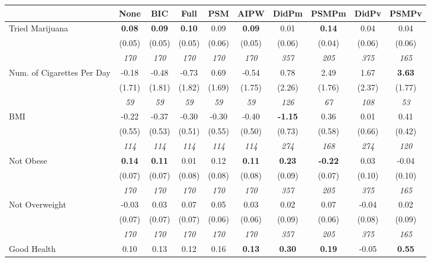 \begin{tabular}{l c c c c c c c c c}
\toprule
 & None & BIC & Full & PSM & AIPW & DidPm & PSMPm & DidPv & PSMPv \\
\midrule
Tried Marijuana & \textbf{ 0.08 } & \textbf{ 0.09 } & \textbf{ 0.10 } & 0.09 & \textbf{0.09} & 0.01 & \textbf{0.14} & 0.04 & 0.04 \\
& (0.05) & (0.05) & (0.05) & (0.06) & (0.05) & (0.06) & (0.04) & (0.06) & (0.06) \\
& \textit{ 170 } & \textit{ 170 } & \textit{ 170 } & \textit{ 170 } & \textit{ 170 } & \textit{ 357 } & \textit{ 205 } & \textit{ 375 } & \textit{ 165 } \\
Num. of Cigarettes Per Day & -0.18 & -0.48 & -0.73 & 0.69 & -0.54 & 0.78 & 2.49 & 1.67 & \textbf{3.63} \\
& (1.71) & (1.81) & (1.82) & (1.69) & (1.75) & (2.26) & (1.76) & (2.37) & (1.77) \\
& \textit{ 59 } & \textit{ 59 } & \textit{ 59 } & \textit{ 59 } & \textit{ 59 } & \textit{ 126 } & \textit{ 67 } & \textit{ 108 } & \textit{ 53 } \\
BMI & -0.22 & -0.37 & -0.30 & -0.30 & -0.40 & \textbf{ -1.15 } & 0.36 & 0.01 & 0.41 \\
& (0.55) & (0.53) & (0.51) & (0.55) & (0.50) & (0.73) & (0.58) & (0.66) & (0.42) \\
& \textit{ 114 } & \textit{ 114 } & \textit{ 114 } & \textit{ 114 } & \textit{ 114 } & \textit{ 274 } & \textit{ 168 } & \textit{ 274 } & \textit{ 120 } \\
Not Obese & \textbf{ 0.14 } & \textbf{ 0.11 } & 0.01 & 0.12 & \textbf{0.11} & \textbf{ 0.23 } & \textbf{-0.22} & 0.03 & -0.04 \\
& (0.07) & (0.07) & (0.08) & (0.08) & (0.08) & (0.09) & (0.07) & (0.10) & (0.10) \\
& \textit{ 170 } & \textit{ 170 } & \textit{ 170 } & \textit{ 170 } & \textit{ 170 } & \textit{ 357 } & \textit{ 205 } & \textit{ 375 } & \textit{ 165 } \\
Not Overweight & -0.03 & 0.03 & 0.07 & 0.05 & 0.03 & 0.02 & 0.07 & -0.04 & 0.02 \\
& (0.07) & (0.07) & (0.07) & (0.06) & (0.06) & (0.09) & (0.06) & (0.08) & (0.09) \\
& \textit{ 170 } & \textit{ 170 } & \textit{ 170 } & \textit{ 170 } & \textit{ 170 } & \textit{ 357 } & \textit{ 205 } & \textit{ 375 } & \textit{ 165 } \\
Good Health & 0.10 & 0.13 & 0.12 & 0.16 & \textbf{0.13} & \textbf{ 0.30 } & \textbf{0.19} & -0.05 & \textbf{0.55} \\

\end{tabular}

